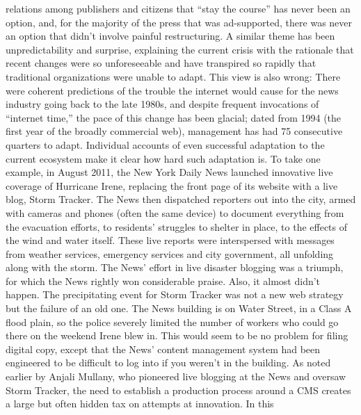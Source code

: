 relations among publishers and citizens that ``stay the course'' has never been an
option, and, for the majority of the press that was ad-supported, there was never
an option that didn’t involve painful restructuring.
A similar theme has been unpredictability and surprise, explaining the current
crisis with the rationale that recent changes were so unforeseeable and have
transpired so rapidly that traditional organizations were unable to adapt. This
view is also wrong: There were coherent predictions of the trouble the internet
would cause for the news industry going back to the late 1980s, and despite
frequent invocations of ``internet time,'' the pace of this change has been glacial;
dated from 1994 (the first year of the broadly commercial web), management has
had 75 consecutive quarters to adapt.
Individual accounts of even successful adaptation to the current ecosystem make
it clear how hard such adaptation is. To take one example, in August 2011, the
New York Daily News launched innovative live coverage of Hurricane Irene,
replacing the front page of its website with a live blog, Storm Tracker.
The News then dispatched reporters out into the city, armed with cameras
and phones (often the same device) to document everything from the evacuation
efforts, to residents’ struggles to shelter in place, to the effects of the
wind and water itself. These live reports were interspersed with messages from
weather services, emergency services and city government, all unfolding along
with the storm.
The News’ effort in live disaster blogging was a triumph, for which the News
rightly won considerable praise. Also, it almost didn’t happen. The precipitating
event for Storm Tracker was not a new web strategy but the failure of an old
one. The News building is on Water Street, in a Class A flood plain, so the police
severely limited the number of workers who could go there on the weekend
Irene blew in. This would seem to be no problem for filing digital copy, except
that the News’ content management system had been engineered to be difficult
to log into if you weren’t in the building.
As noted earlier by Anjali Mullany, who pioneered live blogging at the News
and oversaw Storm Tracker, the need to establish a production process around
a CMS creates a large but often hidden tax on attempts at innovation. In this

